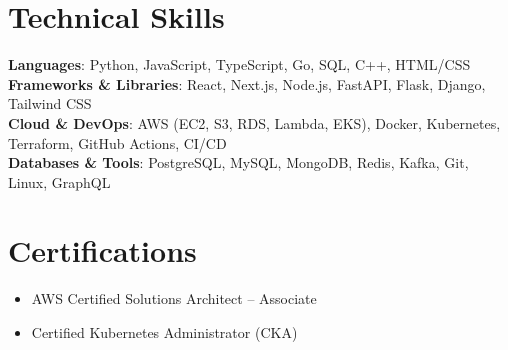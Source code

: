 \documentclass[letterpaper,10.8pt]{article}
\newcommand{\resumeItem}[1]{
  \item\small{
    {#1 \vspace{-2pt}}
  }
}
\newcommand{\resumeItemListStart}{\begin{itemize}[leftmargin=0.15in]}
\newcommand{\resumeItemListEnd}{\end{itemize}\vspace{-4pt}}
\begin{document}
\section{Technical Skills}
 \begin{itemize}[leftmargin=0.15in, label={}]
    \small{\item{
     \textbf{Languages}{: Python, JavaScript, TypeScript, Go, SQL, C++, HTML/CSS} \\
     \textbf{Frameworks \& Libraries}{: React, Next.js, Node.js, FastAPI, Flask, Django, Tailwind CSS} \\
     \textbf{Cloud \& DevOps}{: AWS (EC2, S3, RDS, Lambda, EKS), Docker, Kubernetes, Terraform, GitHub Actions, CI/CD} \\
     \textbf{Databases \& Tools}{: PostgreSQL, MySQL, MongoDB, Redis, Kafka, Git, Linux, GraphQL} \\
    }}
 \end{itemize}

\section{Certifications}
  \resumeItemListStart
    \resumeItem{AWS Certified Solutions Architect – Associate}
    \resumeItem{Certified Kubernetes Administrator (CKA)}
  \resumeItemListEnd


\end{document}
